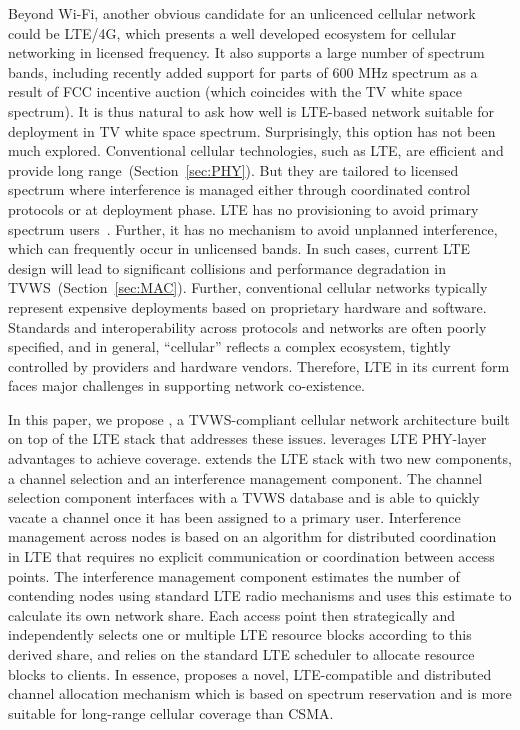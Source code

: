 Beyond Wi-Fi, another obvious candidate for an unlicenced cellular network could be LTE/4G, which presents a well developed ecosystem for cellular networking in licensed frequency.
It also supports a large number of spectrum bands, including recently added support for parts of 600 MHz spectrum as a result of FCC incentive auction (which coincides with the TV white space spectrum).
It is thus natural to ask how well is LTE-based network suitable for deployment in TV white space spectrum.
Surprisingly, this option has not been much explored. 
Conventional cellular technologies, such as LTE, are efficient and provide long range~(Section~\ref{sec:PHY}). 
But they are tailored to licensed spectrum where interference is managed either through coordinated control protocols or at deployment phase. 
LTE has no provisioning to avoid primary spectrum users~\cite{etsi_tvws}. 
Further, it has no mechanism to avoid unplanned interference, which can frequently occur in unlicensed bands.
In such cases, current LTE design will lead to significant collisions and performance degradation in TVWS~(Section~\ref{sec:MAC}).  
Further, conventional cellular networks typically represent expensive deployments based on proprietary hardware and software.
Standards and interoperability across protocols and networks are often poorly specified, 
and in general, ``cellular'' reflects a complex ecosystem, tightly controlled by providers and hardware vendors. 
Therefore, LTE in its current form faces major challenges in supporting network co-existence. 

In this paper, we propose {\em \cf}, a TVWS-compliant cellular network architecture built on top of the LTE stack that addresses these issues. 
\cf leverages LTE PHY-layer advantages to achieve coverage. 
\cf extends the LTE stack with two new components, a channel selection and an interference management component. 
The channel selection component interfaces with a TVWS database and is able to quickly vacate a channel once it has been assigned to a primary user. 
Interference management across \cf nodes is based on an algorithm 
 for distributed coordination in LTE that requires no explicit communication or coordination between access points.
The interference management component estimates the number of contending nodes using standard LTE radio mechanisms and uses this estimate to calculate its own network share. Each access point then strategically and independently selects one or multiple LTE resource blocks according to this derived share, 
and relies on the standard LTE scheduler to allocate resource blocks to clients.  
In essence, \cf proposes a novel, LTE-compatible and distributed channel allocation mechanism which is based on spectrum reservation and is more suitable for long-range cellular coverage than CSMA. 


